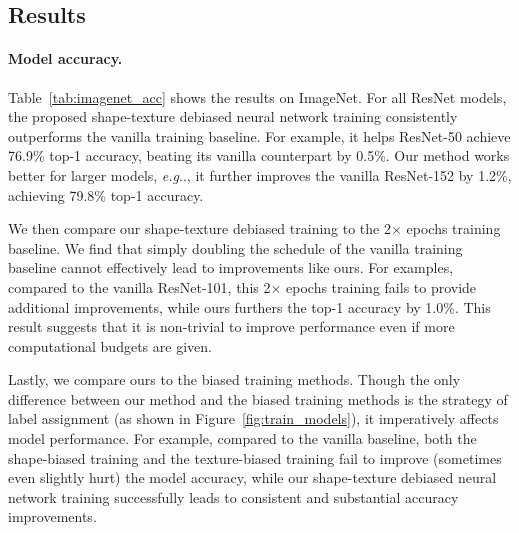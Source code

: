 \documentclass{article} \usepackage{iclr2021_conference,times}
\makeatletter
\DeclareRobustCommand\onedot{\futurelet\@let@token\@onedot}
\def\@onedot{\ifx\@let@token.\else.\null\fi\xspace}
\def\eg{\emph{e.g}\onedot} \def\Eg{\emph{E.g}\onedot}
\makeatother
\begin{document}
\subsection{Results}\label{sec:main_results}

\paragraph{Model accuracy.} 
Table~\ref{tab:imagenet_acc} shows the results on ImageNet. 
For all ResNet models, the proposed shape-texture debiased neural network training consistently outperforms the vanilla training baseline. For example, it helps ResNet-50 achieve 76.9\% top-1 accuracy, beating its vanilla counterpart by 0.5\%. Our method works better for larger models, \eg, it further improves the vanilla ResNet-152 by 1.2\%, achieving 79.8\% top-1 accuracy. 

We then compare our shape-texture debiased training to the 2$\times$ epochs training baseline. We find that simply doubling the schedule of the vanilla training baseline cannot effectively lead to improvements like ours. For examples, compared to the vanilla ResNet-101, this 2$\times$ epochs training fails to provide additional improvements, while ours furthers the top-1 accuracy by 1.0\%. This result suggests that it is non-trivial to improve performance even if more computational budgets are given.


Lastly, we compare ours to the biased training methods. Though the only difference between our method and the biased training methods is the strategy of label assignment (as shown in Figure~\ref{fig:train_models}), it imperatively affects model performance. For example, compared to the vanilla baseline, both the shape-biased training and the texture-biased training fail to improve (sometimes even slightly hurt) the model accuracy, while our shape-texture debiased neural network training successfully leads to consistent and substantial accuracy improvements.
\end{document}
